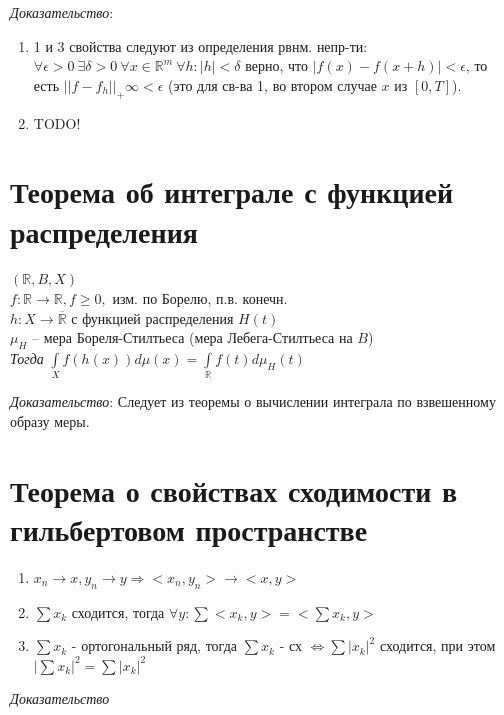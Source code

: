\documentclass[paper=a4, fontsize=17pt]{article}
\begin{document}
\emph{Доказательство}:

\begin{enumerate}
	\item 1 и 3 свойства следуют из определения рвнм. непр-ти:
		$\forall \epsilon > 0 \ \exists \delta > 0 \  \forall x \in \mathbb{R}^m \ \forall h: |h| < \delta$ верно, что $|f(x) - f(x+h)| < \epsilon$, то есть $||f-f_h||_+\infty < \epsilon$
		(это для св-ва 1, во втором случае $x$ из $[0,T]$).
	\item TODO!
\end{enumerate}

\section{Теорема об интеграле с функцией распределения}
$(\mathbb{R}, B, X)$ \\
$f:\mathbb{R}\rightarrow\mathbb{R}, f \ge 0,$ изм. по Борелю, п.в. конечн.\\
$h: X \rightarrow \overline{\mathbb{R}}$ с функцией распределения $H(t)$\\




$\mu_H$ -- мера Бореля-Стилтьеса (мера Лебега-Стилтьеса на $B$)\\


\emph{Тогда} $\int\limits_X f(h(x))d\mu(x) = \int\limits_{\mathbb{R}}f(t)d\mu_{H}(t)$

\emph{Доказательство}:
Следует из теоремы о вычислении интеграла по взвешенному образу меры.

\section{Теорема о свойствах сходимости в гильбертовом пространстве}
\begin{enumerate}
	\item $x_n \rightarrow x, y_n \rightarrow y \Rightarrow <x_n, y_n> \rightarrow <x, y>$

	\item $\sum x_k$ сходится, тогда $\forall y: \sum <x_k, y> = <\sum x_k, y>$

	\item $\sum x_k$ - ортогональный ряд, тогда $\sum x_k$ - сх $\Leftrightarrow \sum |x_k|^2$ сходится, при этом $|\sum x_k|^2 = \sum |x_k|^2$

\end{enumerate}

\emph{Доказательство}
\end{document}
